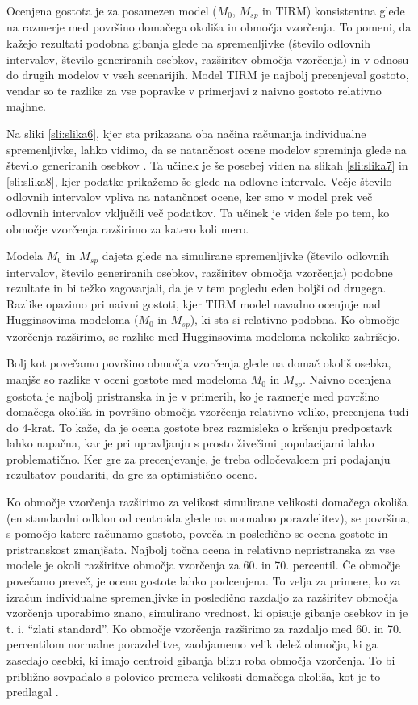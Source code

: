 Ocenjena gostota je za posamezen model ($M_0$, $M_{sp}$ in TIRM) konsistentna glede na razmerje med površino domačega okoliša in območja vzorčenja. To pomeni, da kažejo rezultati podobna gibanja glede na spremenljivke (število odlovnih intervalov, število generiranih osebkov, razširitev območja vzorčenja) in v odnosu do drugih modelov v vseh scenarijih. Model TIRM je najbolj precenjeval gostoto, vendar so te razlike za vse popravke v primerjavi z naivno gostoto relativno majhne.

Na sliki \ref{sli:slika6}, kjer sta prikazana oba načina računanja individualne spremenljivke, lahko vidimo, da se natančnost ocene modelov spreminja glede na število generiranih osebkov \citep{eberhardt_using_1990}. Ta učinek je še posebej viden na slikah \ref{sli:slika7} in \ref{sli:slika8}, kjer podatke prikažemo še glede na odlovne intervale. Večje število odlovnih intervalov vpliva na natančnost ocene, ker smo v model prek več odlovnih intervalov vključili več podatkov. Ta učinek je viden šele po tem, ko območje vzorčenja razširimo za katero koli mero.

Modela $M_0$ in $M_{sp}$ dajeta glede na simulirane spremenljivke (število odlovnih intervalov, število generiranih osebkov, razširitev območja vzorčenja) podobne rezultate in bi težko zagovarjali, da je v tem pogledu eden boljši od drugega. Razlike opazimo pri naivni gostoti, kjer TIRM model navadno ocenjuje nad Hugginsovima modeloma ($M_0$ in $M_{sp}$), ki sta si relativno podobna. Ko območje vzorčenja razširimo, se razlike med Hugginsovima modeloma nekoliko zabrišejo.

Bolj kot povečamo površino območja vzorčenja glede na domač okoliš osebka, manjše so razlike v oceni gostote med modeloma $M_0$ in $M_{sp}$. Naivno ocenjena gostota je najbolj pristranska in je v primerih, ko je razmerje med površino domačega okoliša in površino območja vzorčenja relativno veliko, precenjena tudi do 4-krat. To kaže, da je ocena gostote brez razmisleka o kršenju predpostavk lahko napačna, kar je pri upravljanju s prosto živečimi populacijami lahko problematično. Ker gre za precenjevanje, je treba odločevalcem pri podajanju rezultatov poudariti, da gre za optimistično oceno.

Ko območje vzorčenja razširimo za velikost simulirane velikosti domačega okoliša (en standardni odklon od centroida glede na normalno porazdelitev), se površina, s pomočjo katere računamo gostoto, poveča in posledično se ocena gostote in pristranskost zmanjšata. Najbolj točna ocena in relativno nepristranska za vse modele je okoli razširitve območja vzorčenja za 60. in 70. percentil. Če območje povečamo preveč, je ocena gostote lahko podcenjena. To velja za primere, ko za izračun individualne spremenljivke in posledično razdaljo za razširitev območja vzorčenja uporabimo znano, simulirano vrednost, ki opisuje gibanje osebkov in je t. i. ``zlati standard''. Ko območje vzorčenja razširimo za razdaljo med 60. in 70. percentilom normalne porazdelitve, zaobjamemo velik delež območja, ki ga zasedajo osebki, ki imajo centroid gibanja blizu roba območja vzorčenja. To bi približno sovpadalo s polovico premera velikosti domačega okoliša, kot je to predlagal \citet{dice_census_1938}.

